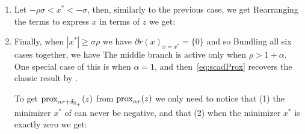 \begin{enumerate}
    \item Let $-\rho\sigma < x^* < -\sigma$, then, similarly to the previous case, we get 
    Rearranging the terms to express $x$ in terms of $z$ we get:
    \item Finally, when $|x^*| \geq \sigma\rho$ we have $\partial r(x)_{x = x^*} = \{0\}$ and so 
    Bundling all six cases together,  we have
The middle branch is active only when $\rho > 1+\alpha$. One special case of this is when $\alpha = 1$, and then~\eqref{eq:scadProx} recovers    the classic result by \cite{Fan2001}. 
    
To get ${\mathrm{prox}}_{\alpha r + \delta_{\operatorname{\mathbb{R}}_+}}(z)$ from ${\mathrm{prox}}_{\alpha r}(z)$ we only need to notice that (1) the minimizer $x^*$ of 
can never be negative, and that (2) when the minimizer $x^*$ is exactly zero we get:
    
\end{enumerate}

